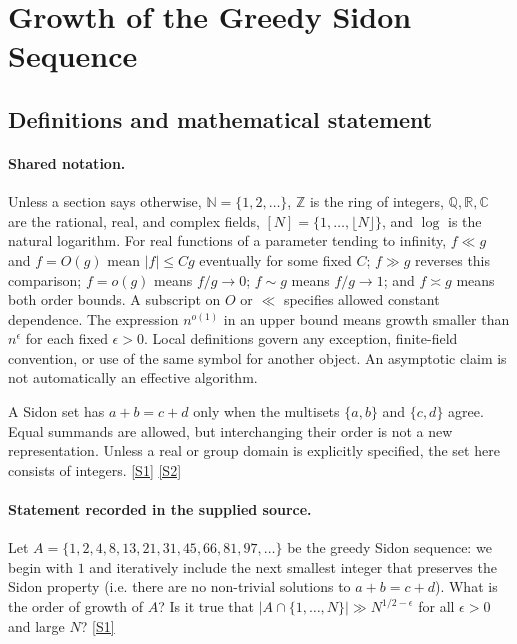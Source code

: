 \documentclass[11pt,a4paper]{article}
\newcommand{\N}{\mathbb{N}}
\newcommand{\Z}{\mathbb{Z}}
\newcommand{\Q}{\mathbb{Q}}
\newcommand{\R}{\mathbb{R}}
\newcommand{\C}{\mathbb{C}}
\newcommand{\sref}[2]{\hyperlink{source:#1:#2}{[S#2]}}
\begin{document}
\section{Growth of the Greedy Sidon Sequence}\label{statement}


\subsection{Definitions and mathematical statement}

\paragraph{Shared notation.}Unless a section says otherwise, $\N=\{1,2,\ldots\}$,
$\Z$ is the ring of integers, $\Q,\R,\C$ are the rational, real, and complex
fields, $[N]=\{1,\ldots,\lfloor N\rfloor\}$, and $\log$ is the natural
logarithm. For real functions of a parameter tending to infinity,
$f\ll g$ and $f=O(g)$ mean $|f|\leq Cg$ eventually for some fixed $C$;
$f\gg g$ reverses this comparison; $f=o(g)$ means $f/g\to0$;
$f\sim g$ means $f/g\to1$; and $f\asymp g$ means both order bounds.
A subscript on $O$ or $\ll$ specifies allowed constant dependence.
The expression $n^{o(1)}$ in an upper bound means growth smaller than
$n^\epsilon$ for each fixed $\epsilon>0$. Local definitions govern any
exception, finite-field convention, or use of the same symbol for another
object. An asymptotic claim is not automatically an effective algorithm.



A Sidon set has $a+b=c+d$ only when the multisets $\{a,b\}$ and $\{c,d\}$ agree. Equal summands are allowed, but interchanging their order is not a new representation. Unless a real or group domain is explicitly specified, the set here consists of integers. \sref{statement}{1} \sref{statement}{2}

\paragraph{Statement recorded in the supplied source.}
Let $A=\{1,2,4,8,13,21,31,45,66,81,97,\ldots\}$ be the greedy Sidon sequence: we begin with $1$ and iteratively include the next smallest integer that preserves the Sidon property (i.e. there are no non-trivial solutions to $a+b=c+d$). What is the order of growth of $A$? Is it true that $ \lvert A\cap \{1,\ldots,N\}\rvert \gg N^{1/2-\epsilon} $ for all $\epsilon>0$ and large $N$? \sref{statement}{1}
\end{document}
